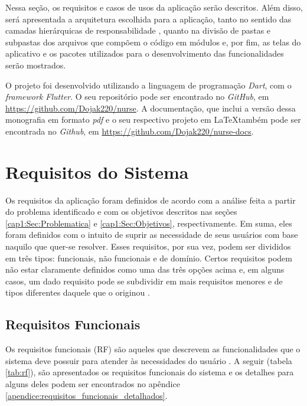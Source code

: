 
\label{Cap:Implementacao}
Nessa seção, os requisitos e casos de usos da aplicação serão descritos. Além disso, será apresentada a arquitetura escolhida para a aplicação, tanto no sentido das camadas hierárquicas de responsabilidade \cite{Faust2020}, quanto na divisão de pastas e subpastas dos arquivos que compõem o código em módulos e, por fim, as telas do aplicativo e os pacotes utilizados para o desenvolvimento das funcionalidades serão mostrados.

O projeto foi desenvolvido utilizando a linguagem de programação \textit{Dart}, com o \textit{framework Flutter}. O seu repositório pode ser encontrado no \textit{GitHub}, em \url{https://github.com/Dojak220/nurse}. A documentação, que inclui a versão dessa monografia em formato \textit{pdf} e o seu respectivo projeto em \LaTeX também pode ser encontrada no \textit{Github}, em \url{https://github.com/Dojak220/nurse-docs}.

\section{Requisitos do Sistema}
\label{cap4:Sec:Requisitos}

Os requisitos da aplicação foram definidos de acordo com a análise feita a partir do problema identificado e com os objetivos descritos nas seções \ref{cap1:Sec:Problematica} e \ref{cap1:Sec:Objetivos}, respectivamente. Em suma, eles foram definidos com o intuito de suprir as necessidade de seus usuários com base naquilo que quer-se resolver. Esses requisitos, por sua vez, podem ser divididos em três tipos: funcionais, não funcionais e de domínio. Certos requisitos podem não estar claramente definidos como uma das três opções acima e, em alguns casos, um dado requisito pode se subdividir em mais requisitos menores e de tipos diferentes daquele que o originou \cite{sommerville2007engineering}. 

\subsection{Requisitos Funcionais}
\label{cap4:Subsec:RequisitosFuncionais}
Os requisitos funcionais (RF) são aqueles que descrevem as funcionalidades que o sistema deve possuir para atender às necessidades do usuário \cite{sommerville2007engineering}. A seguir (tabela \ref{tab:rf}), são apresentados os requisitos funcionais do sistema e os detalhes para alguns deles podem ser encontrados no apêndice \ref{apendice:requisitos_funcionais_detalhados}.

